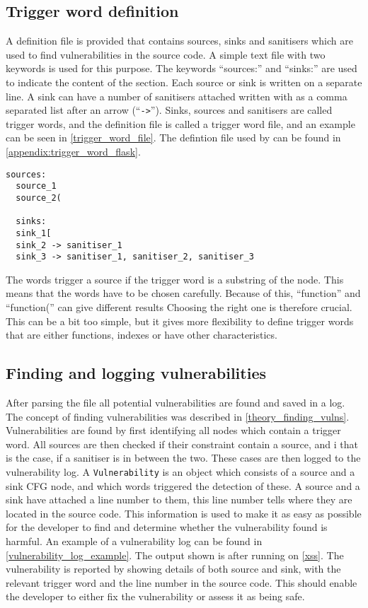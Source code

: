 \subsection{Trigger word definition}
A definition file is provided that contains sources, sinks and sanitisers which are used to find vulnerabilities in the source code.
A simple text file with two keywords  is used for this purpose.
The keywords ``sources:'' and ``sinks:'' are used to indicate the content of the section.
Each source or sink is written on a separate line.
A sink can have a number of sanitisers attached written with as a comma separated list after an arrow (``\texttt{->}'').
Sinks, sources and sanitisers are called trigger words, and the definition file is called a trigger word file, and an example can be seen in \cref{trigger_word_file}.
The defintion file used by \pyt{} can be found in \cref{appendix:trigger_word_flask}.
\begin{lstlisting}[style=default, caption={How the trigger word file should be defined.}, label={trigger_word_file}]
  sources:
  source_1
  source_2(

  sinks:
  sink_1[
  sink_2 -> sanitiser_1
  sink_3 -> sanitiser_1, sanitiser_2, sanitiser_3
\end{lstlisting}

The words trigger a source if the trigger word is a substring of the node.
This means that the words have to be chosen carefully.
Because of this, ``function'' and ``function('' can give different results
Choosing the right one is therefore crucial.
This can be a bit too simple, but it gives more flexibility to define trigger words that are either functions, indexes or have other characteristics.

\subsection{Finding and logging vulnerabilities}
After parsing the file all potential vulnerabilities are found and saved in a log.
The concept of finding vulnerabilities was described in \cref{theory_finding_vulns}.
Vulnerabilities are found by first identifying all nodes which contain a trigger word.
All sources are then checked if their constraint contain a source, and i that is the case, if a sanitiser is in between the two.
These cases are then logged to the vulnerability log.
A \texttt{Vulnerability} is an object which consists of a source and a sink CFG node, and which words triggered the detection of these.
A source and a sink have attached a line number to them, this line number tells where they are located in the source code.
This information is used to make it as easy as possible for the developer to find and determine whether the vulnerability found is harmful.
An example of a vulnerability log can be found in \cref{vulnerability_log_example}.
The output shown is after running \pyt{} on \cref{xss}.
The vulnerability is reported by showing details of both source and sink, with the relevant trigger word and the line number in the source code.
This should enable the developer to either fix the vulnerability or assess it as being safe.

